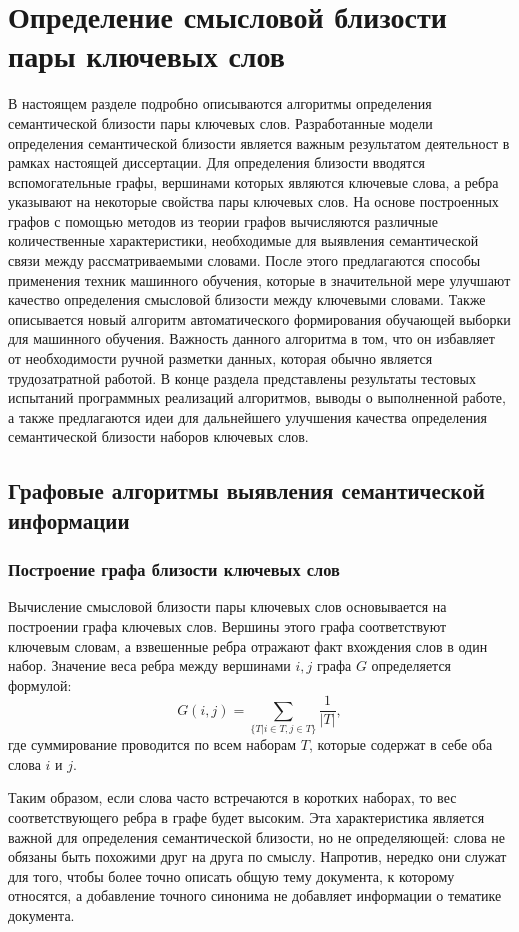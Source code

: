 \chapter{Определение смысловой близости пары ключевых слов} \label{chapt1}
В настоящем разделе подробно описываются алгоритмы определения семантической близости пары ключевых слов. Разработанные модели определения семантической близости является важным результатом деятельност в рамках настоящей диссертации.
Для определения близости вводятся вспомогательные графы, вершинами которых являются ключевые слова, а ребра указывают на некоторые свойства пары ключевых слов.
На основе построенных графов с помощью методов из теории графов вычисляются различные количественные характеристики, необходимые для выявления семантической связи между рассматриваемыми словами.
После этого предлагаются способы применения техник машинного обучения, которые в значительной мере улучшают качество определения смысловой близости между ключевыми словами. 
Также описывается новый алгоритм автоматического формирования обучающей выборки для машинного обучения. Важность данного алгоритма в том, что он избавляет от необходимости ручной разметки данных, которая обычно является трудозатратной работой.
В конце раздела представлены результаты тестовых испытаний программных реализаций алгоритмов, выводы о выполненной работе, а также предлагаются идеи для дальнейшего улучшения качества определения семантической близости наборов ключевых слов.

\section{Графовые алгоритмы выявления семантической информации}
\subsection{Построение графа близости ключевых слов} \label{sect1_1}
Вычисление смысловой близости пары ключевых слов основывается на построении графа ключевых слов. Вершины этого графа соответствуют ключевым словам, а взвешенные ребра отражают факт вхождения слов в один набор. Значение веса ребра между вершинами $i, j$ графа $G$ определяется формулой:
$$ G(i, j) = \sum_{\{T|i\in T, j \in T\}}\frac{1}{|T|}, $$
где суммирование проводится по всем наборам $T$, которые содержат в себе оба слова $i$ и $j$.

Таким образом, если слова часто встречаются в  коротких наборах, то вес соответствующего ребра в графе будет высоким. Эта характеристика является важной для определения семантической близости, но не определяющей: слова не обязаны быть похожими друг на друга по смыслу. Напротив, нередко они служат для того, чтобы более точно описать общую тему документа, к которому относятся, а добавление точного синонима не добавляет информации о тематике документа. 

